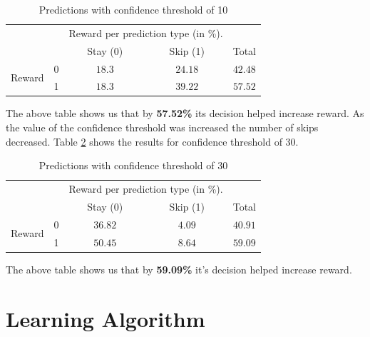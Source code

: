 \begin{table}[H]
    \centering
\begin{tabular}{l|l|c|c|c}
\multicolumn{2}{c}{}&\multicolumn{2}{c}{Reward per prediction type (in \%).}&\\
\cline{3-4}
\multicolumn{2}{c|}{}&Stay (0) &Skip (1)&\multicolumn{1}{c}{Total}\\
\cline{2-4}
\multirow{2}{*}{Reward}& 0 & $18.3$ & $24.18$ & $42.48$\\
\cline{2-4}
& 1 & $18.3$ & $39.22$ & $57.52$\\
\cline{2-4}
\end{tabular}
\caption{Predictions with confidence threshold of 10}
\label{CT_opt}
\end{table}

The above table shows us that by \textbf{57.52\%} its decision helped increase reward. As the value of the confidence threshold was increased the number of skips decreased. Table \ref{threshold_30} shows the results for confidence threshold of 30.

\begin{table}[H]
    \centering
    \begin{tabular}{l|l|c|c|c}
    \multicolumn{2}{c}{}&\multicolumn{2}{c}{Reward per prediction type (in \%).}&\\
    \cline{3-4}
    \multicolumn{2}{c|}{}&Stay (0) &Skip (1)&\multicolumn{1}{c}{Total}\\
    \cline{2-4}
    \multirow{2}{*}{Reward}& 0 & $36.82$ & $4.09$ & $40.91$\\
    \cline{2-4}
    & 1 & $50.45$ & $8.64$ & $59.09$\\
    \cline{2-4}
    \end{tabular}
\caption{Predictions with confidence threshold of 30}
\label{threshold_30}
\end{table}

The above table shows us that by \textbf{59.09\%} it's decision helped increase reward.\par

\section{Learning Algorithm \label{chap6:la}}

